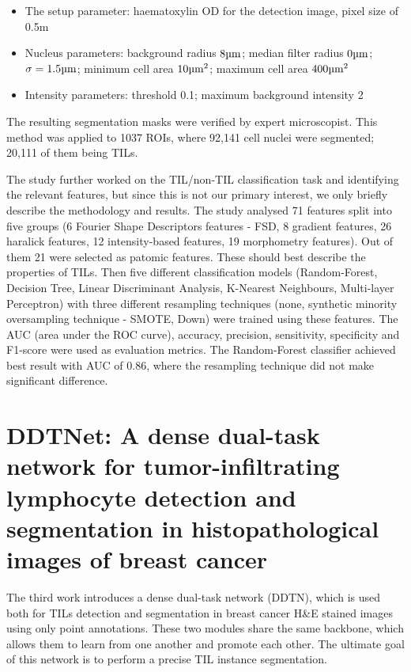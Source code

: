 \begin{itemize}
    \item The setup parameter: haematoxylin OD for the detection image, pixel size of 0.5\textmu m
    \item Nucleus parameters: background radius $8 \text{\textmu m}$; median filter radius $0 \text{\textmu m}$; $\sigma = 1.5 \text{\textmu m}$; minimum cell area $10 \text{\textmu m}^2$; maximum cell area $400 \text{\textmu m}^2$
    \item Intensity parameters: threshold 0.1; maximum background intensity 2
\end{itemize}

The resulting segmentation masks were verified by expert microscopist. This method was applied to 1037 ROIs, where 92,141 cell nuclei were segmented; 20,111 of them being TILs.

The study further worked on the TIL/non-TIL classification task and identifying the relevant features, but since this is not our primary interest, we only briefly describe the methodology and results. The study analysed 71 features split into five groups (6 Fourier Shape Descriptors features - FSD, 8 gradient features, 26 haralick features, 12 intensity-based features, 19 morphometry features). Out of them 21 were selected as patomic features. These should best describe the properties of TILs. Then five different classification models (Random-Forest, Decision Tree, Linear Discriminant Analysis, K-Nearest Neighbours, Multi-layer Perceptron) with three different resampling techniques (none, synthetic minority oversampling technique - SMOTE, Down) were trained using these features. The AUC (area under the ROC curve), accuracy, precision, sensitivity, specificity and F1-score were used as evaluation metrics. The Random-Forest classifier achieved best result with AUC of 0.86, where the resampling technique did not make significant difference.

\section{DDTNet: A dense dual-task network for tumor-infiltrating lymphocyte detection and segmentation in histopathological images of breast cancer \cite{Zhang2022}}
The third work introduces a dense dual-task network (DDTN), which is used both for TILs detection and segmentation in breast cancer H\&E stained images using only point annotations. These two modules share the same backbone, which allows them to learn from one another and promote each other. The ultimate goal of this network is to perform a precise TIL instance segmentation.

